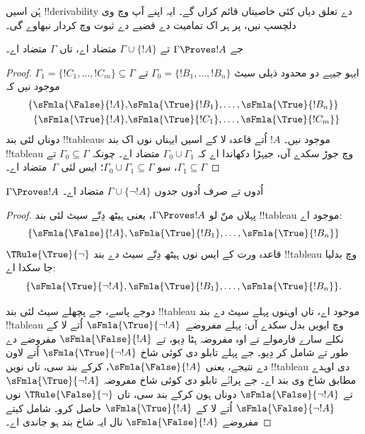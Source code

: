 \documentclass[../../../include/open-logic-section]{subfiles}
\begin{document}
      {}
      {}


ہُن اسیں !!{derivability} دے تعلق دیاں کئی خاصیتاں قائم کراں گے۔ ایہ
اپنے آپ وچ وی دلچسپ نیں، پر ہر اک تمامیت دے قضیے دے ثبوت وچ کردار
نبھاوے گی۔

\begin{prop}
  جے $\Gamma \Proves !A$ تے $\Gamma \cup \{!A\}$ متضاد اے، تاں
  $\Gamma$ متضاد اے۔
\end{prop}

\begin{proof}
ایہو جیہے دو محدود ذیلی سیٹ $\Gamma_0 = \{!B_1, \dots, !B_n\}$ تے $\Gamma_1
  =\{!C_1, \dots, !C_m\} \subseteq \Gamma$ موجود نیں کہ
  \begin{align*}
    \{\sFmla{\False}{!A}, &
    \sFmla{\True}{!B_1}, \dots, \sFmla{\True}{!B_n}\} \\
    \{\sFmla{\True}{!A}, &
    \sFmla{\True}{!C_1}, \dots, \sFmla{\True}{!C_m}\}
  \end{align*}
  دوناں لئی بند !!{tableau}s موجود نیں۔ $!A$ اُتے \Cut{} قاعدہ لا کے
  اسیں ایہناں نوں اک بند !!{tableau} وچ جوڑ سکدے آں، جیہڑا دکھاندا اے کہ $\Gamma_0
  \cup \Gamma_1$ متضاد اے۔ چونکہ $\Gamma_0
  \subseteq \Gamma$ تے $\Gamma_1 \subseteq \Gamma$، سو $\Gamma_0 \cup
  \Gamma_1 \subseteq \Gamma$؛ ایس لئی $\Gamma$~متضاد اے۔
\end{proof}

\begin{prop}
$\Gamma \Proves !A$ اُدوں تے صرف اُدوں جدوں $\Gamma \cup \{\lnot !A\}$ متضاد اے۔
\end{prop}

\begin{proof}
پہلاں منّ لو $\Gamma \Proves !A$، یعنی ہیٹھ دِتّے سیٹ لئی بند
!!{tableau} موجود اے:
\[
\{\sFmla{\False}{!A},
\sFmla{\True}{!B_1}, \dots, \sFmla{\True}{!B_n}\}
\]
$\TRule{\True}{\lnot}$ قاعدہ ورت کے ایس نوں ہیٹھ دِتّے سیٹ دے
بند !!{tableau} وچ بدلیا جا سکدا اے:
\[
\{\sFmla{\True}{\lnot !A},
\sFmla{\True}{!B_1}, \dots, \sFmla{\True}{!B_n}\}.
\]

دوجے پاسے، جے پچھلے سیٹ لئی بند !!{tableau} موجود اے، تاں اوہنوں
پہلے سیٹ دے بند !!{tableau} وچ ایویں بدل سکدے آں: پہلے
مفروضے~$\sFmla{\True}{\lnot !A}$ اُتے \TRule{\True}{\lnot}
لا کے نکلے سارے فارمولے تے اوہ مفروضہ ہٹا دِیو، تے
$\sFmla{\False}{!A}$ مفروضے دے طور تے شامل کر دِیو۔ جے پہلے
تابلو دی کوئی شاخ $\sFmla{\True}{\lnot !A}$ اُتے
\TRule{\True}{\lnot} لاون دے نتیجے، یعنی $\sFmla{\False}{!A}$،
کرکے بند سی، تاں نویں !!{tableau} دی اوہدے مطابق شاخ وی بند اے۔
جے پراݨے تابلو دی کوئی شاخ مفروضہ $\sFmla{\True}{\lnot !A}$ تے
$\sFmla{\False}{\lnot !A}$ دوناں ہون کرکے بند سی، تاں
$\TRule{\False}{\lnot}$ نوں $\sFmla{\False}{\lnot !A}$ اُتے لا کے
$\sFmla{\True}{!A}$ حاصل کرو۔ شامل کیتے مفروضے
$\sFmla{\False}{!A}$ نال ایہ شاخ بند ہو جاندی اے۔
\end{proof}
\end{document}
